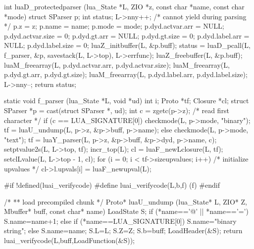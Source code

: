 \begin{LuaCCode}[caption=Definition of \func{luaD\_protectedparser} from \filename{ldo.c}]
int luaD_protectedparser (lua_State *L, ZIO *z, const char *name,
                                        const char *mode) {
  struct SParser p;
  int status;
  L->nny++;  /* cannot yield during parsing */
  p.z = z; p.name = name; p.mode = mode;
  p.dyd.actvar.arr = NULL; p.dyd.actvar.size = 0;
  p.dyd.gt.arr = NULL; p.dyd.gt.size = 0;
  p.dyd.label.arr = NULL; p.dyd.label.size = 0;
  luaZ_initbuffer(L, &p.buff);
  status = luaD_pcall(L, f_parser, &p, savestack(L, L->top), L->errfunc);
  luaZ_freebuffer(L, &p.buff);
  luaM_freearray(L, p.dyd.actvar.arr, p.dyd.actvar.size);
  luaM_freearray(L, p.dyd.gt.arr, p.dyd.gt.size);
  luaM_freearray(L, p.dyd.label.arr, p.dyd.label.size);
  L->nny--;
  return status;
}
\end{LuaCCode}


\begin{LuaCCode}[caption=Definition of \func{f\_parser} from \filename{ldo.c}]
static void f_parser (lua_State *L, void *ud) {
  int i;
  Proto *tf;
  Closure *cl;
  struct SParser *p = cast(struct SParser *, ud);
  int c = zgetc(p->z);  /* read first character */
  if (c == LUA_SIGNATURE[0]) {
    checkmode(L, p->mode, "binary");
    tf = luaU_undump(L, p->z, &p->buff, p->name);
  }
  else {
    checkmode(L, p->mode, "text");
    tf = luaY_parser(L, p->z, &p->buff, &p->dyd, p->name, c);
  }
  setptvalue2s(L, L->top, tf);
  incr_top(L);
  cl = luaF_newLclosure(L, tf);
  setclLvalue(L, L->top - 1, cl);
  for (i = 0; i < tf->sizeupvalues; i++)  /* initialize upvalues */
    cl->l.upvals[i] = luaF_newupval(L);
}
\end{LuaCCode}


\begin{LuaCCode}[caption=Definition of \func{luaU\_undump} from \filename{lundump.c}]
#if !defined(luai_verifycode)
#define luai_verifycode(L,b,f)	(f)
#endif

/*
** load precompiled chunk
*/
Proto* luaU_undump (lua_State* L, ZIO* Z, Mbuffer* buff, const char* name)
{
 LoadState S;
 if (*name=='@' || *name=='=')
  S.name=name+1;
 else if (*name==LUA_SIGNATURE[0])
  S.name="binary string";
 else
  S.name=name;
 S.L=L;
 S.Z=Z;
 S.b=buff;
 LoadHeader(&S);
 return luai_verifycode(L,buff,LoadFunction(&S));
}
\end{LuaCCode}

